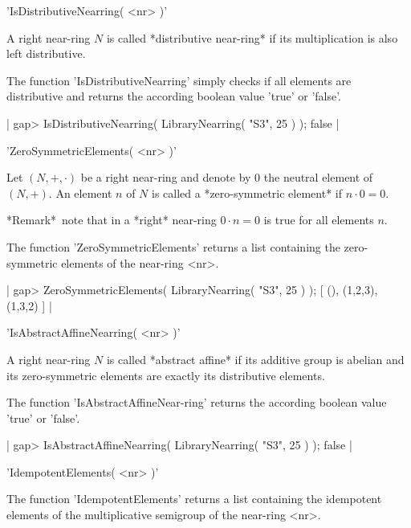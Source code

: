    
'IsDistributiveNearring( <nr> )'  

A right near-ring $N$ is called *distributive near-ring* if its
multiplication is also left distributive.

The function 'IsDistributiveNearring' simply checks if all elements
are distributive and returns the according boolean value 
'true' or 'false'.

|  gap> IsDistributiveNearring( LibraryNearring( "S3", 25 ) );
  false
|

   
'ZeroSymmetricElements( <nr> )'  

Let $(N,+,\cdot)$ be a right near-ring and denote by $0$ the neutral element 
of $(N,+)$. 
An element $n$ of $N$ is called a 
*zero-symmetric element* if $n \cdot 0 = 0$. 

*Remark\:*\ note that in a *right* near-ring $0 \cdot n = 0$ is true
for all elements $n$.

The function 'ZeroSymmetricElements' returns a list containing the 
zero-symmetric elements of the near-ring <nr>. 

|  gap> ZeroSymmetricElements( LibraryNearring( "S3", 25 ) ); 
  [ (), (1,2,3), (1,3,2) ]
|

   
'IsAbstractAffineNearring( <nr> )'  

A right near-ring $N$ is called *abstract affine* if its
additive group is abelian and its zero-symmetric elements are exactly
its distributive elements.

The function 'IsAbstractAffineNear-ring' returns the according boolean 
value 'true' or 'false'.

|  gap> IsAbstractAffineNearring( LibraryNearring( "S3", 25 ) );
  false
|

   
'IdempotentElements( <nr> )'  

The function 'IdempotentElements' returns a list containing the 
idempotent elements of the multiplicative semigroup of the near-ring <nr>. 

